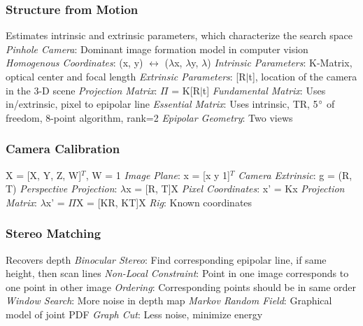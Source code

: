 \documentclass{article}
\author{Ian Chen}
\date{\today}
\begin{document}
    \begin{multicols*}{2}
        \subsubsection*{Structure from Motion}
        Estimates intrinsic and extrinsic parameters, which characterize the search space\newline
        \textit{Pinhole Camera}: Dominant image formation model in computer vision\newline
        \textit{Homogenous Coordinates}: (x, y) $\leftrightarrow$ ($\lambda$x, $\lambda$y, $\lambda$)\newline
        \textit{Intrinsic Parameters}: K-Matrix, optical center and focal length\newline
        \textit{Extrinsic Parameters}: [R$\mid$t], location of the camera in the 3-D scene\newline
        \textit{Projection Matrix}: $\Pi$ = K[R$\mid$t]\newline
        \textit{Fundamental Matrix}: Uses in/extrinsic, pixel to epipolar line\newline
        \textit{Essential Matrix}: Uses intrinsic, TR, 5$\degree$ of freedom, 8-point
        algorithm, rank=2\newline
        \textit{Epipolar Geometry}: Two views
        \subsubsection*{Camera Calibration}
        X = [X, Y, Z, W]$^T$, W = 1\newline
        \textit{Image Plane}: x = [x y 1]$^T$\newline
        \textit{Camera Extrinsic}: g = (R, T)\newline
        \textit{Perspective Projection}: $\lambda$x = [R, T]X\newline
        \textit{Pixel Coordinates}: x' = Kx\newline
        \textit{Projection Matrix}: $\lambda$x' = $\Pi$X = [KR, KT]X\newline
        \textit{Rig}: Known coordinates
        \subsubsection*{Stereo Matching}
        Recovers depth\newline
        \textit{Binocular Stereo}: Find corresponding epipolar line, if same height, then
        scan lines\newline
        \textit{Non-Local Constraint}: Point in one image corresponds to one point in other image\newline
        \textit{Ordering}: Corresponding points should be in same order\newline
        \textit{Window Search}: More noise in depth map\newline
        \textit{Markov Random Field}: Graphical model of joint PDF\newline
        \textit{Graph Cut}: Less noise, minimize energy

\end{multicols*}
\end{document}
